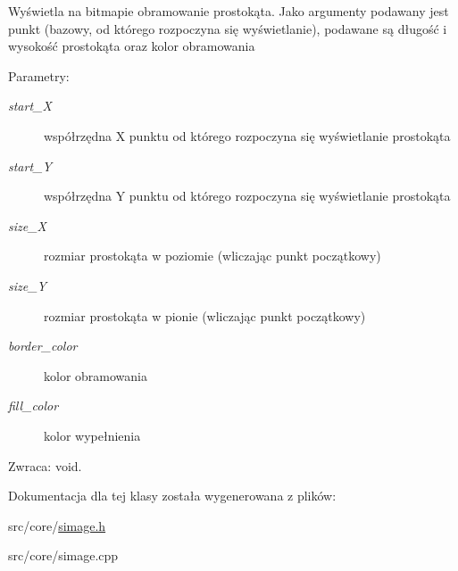 Wyświetla na bitmapie obramowanie prostokąta. Jako argumenty podawany jest punkt (bazowy, od którego rozpoczyna się wyświetlanie), podawane są długość i wysokość prostokąta oraz kolor obramowania \begin{Desc}
\item[Parametry:]
\begin{description}
\item[{\em start\_\-X}]współrzędna X punktu od którego rozpoczyna się wyświetlanie prostokąta \item[{\em start\_\-Y}]współrzędna Y punktu od którego rozpoczyna się wyświetlanie prostokąta \item[{\em size\_\-X}]rozmiar prostokąta w poziomie (wliczając punkt początkowy) \item[{\em size\_\-Y}]rozmiar prostokąta w pionie (wliczając punkt początkowy) \item[{\em border\_\-color}]kolor obramowania \item[{\em fill\_\-color}]kolor wypełnienia \end{description}
\end{Desc}
\begin{Desc}
\item[Zwraca:]void. \end{Desc}


Dokumentacja dla tej klasy została wygenerowana z plików:\begin{CompactItemize}
\item 
src/core/\hyperlink{simage_8h}{simage.h}\item 
src/core/simage.cpp\end{CompactItemize}
